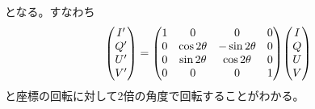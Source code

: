 \documentclass[../../main.tex]{subfiles}
\begin{document}
となる。すなわち
\begin{equation}
    \mqty(I' \\ Q' \\ U' \\ V') = \mqty(1 & 0 & 0 & 0 \\ 0 & \cos2\theta & -\sin2\theta & 0 \\ 0 & \sin2\theta & \cos2\theta & 0 \\ 0 & 0 & 0 & 1)\mqty(I \\ Q \\ U \\ V)
    \label{eq:stokes_transform}
\end{equation}
と座標の回転に対して2倍の角度で回転することがわかる。
\end{document}
